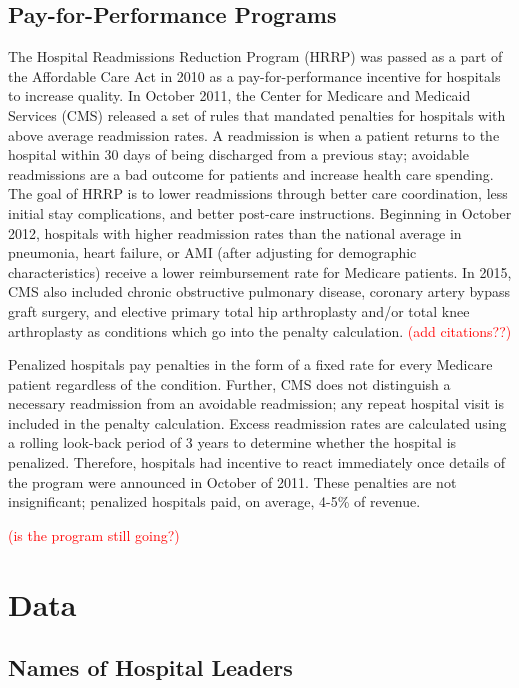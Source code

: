 \documentclass[12pt]{article}
\begin{document}
  
    \subsection{Pay-for-Performance Programs}\label{sec:hrrp}

    The Hospital Readmissions Reduction Program (HRRP) was passed as a part of the Affordable Care Act in 2010 as a pay-for-performance incentive for hospitals to increase quality. In October 2011, the Center for Medicare and Medicaid Services (CMS) released a set of rules that mandated penalties for hospitals with above average readmission rates. A readmission is when a patient returns to the hospital within 30 days of being discharged from a previous stay; avoidable readmissions are a bad outcome for patients and increase health care spending. The goal of HRRP is to lower readmissions through better care coordination, less initial stay complications, and better post-care instructions. Beginning in October 2012, hospitals with higher readmission rates than the national average in pneumonia, heart failure, or AMI (after adjusting for demographic characteristics) receive a lower reimbursement rate for Medicare patients. In 2015, CMS also included chronic obstructive pulmonary disease, coronary artery bypass graft surgery, and elective primary total hip arthroplasty and/or total knee arthroplasty as conditions which go into the penalty calculation. \textcolor{red}{(add citations??)}
    
    Penalized hospitals pay penalties in the form of a fixed rate for every Medicare patient regardless of the condition. Further, CMS does not distinguish a necessary readmission from an avoidable readmission; any repeat hospital visit is included in the penalty calculation. Excess readmission rates are calculated using a rolling look-back period of 3 years to determine whether the hospital is penalized. Therefore, hospitals had incentive to react immediately once details of the program were announced in October of 2011. These penalties are not insignificant; penalized hospitals paid, on average, 4-5\% of revenue. 

    \textcolor{red}{(is the program still going?)}

    

	\section{Data}\label{sec:data}

    \subsection{Names of Hospital Leaders}
\end{document}

